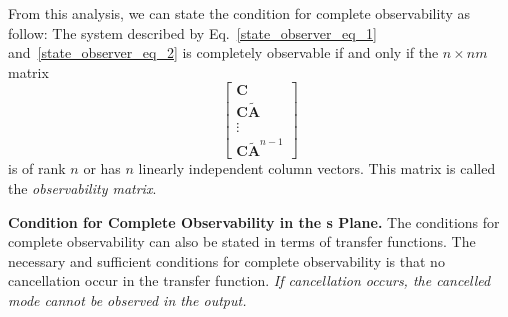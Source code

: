 \documentclass[12pt,a4paper,oneside]{book}
\begin{document}
\begin{onehalfspace}
From this analysis, we can state the condition for complete observability as 
follow: The system described by Eq.~\eqref{state_observer_eq_1} 
and~\eqref{state_observer_eq_2} is completely observable if and only if the $n 
\times nm$ matrix
\begin{equation}
\begin{bmatrix}
	\mathbf{C}  \\
	\mathbf{C}\tilde{\mathbf{A}} \\
	\vdots \\
	\mathbf{C}\tilde{\mathbf{A}}^{n-1}
\end{bmatrix}
\end{equation}
is of rank $n$ or has $n$ linearly independent column vectors. This matrix is 
called the \textit{observability matrix}.

\vspace{5mm}
\textbf{Condition for Complete Observability in the s Plane.} The conditions 
for complete observability can also be stated in terms of transfer functions. 
The necessary and sufficient conditions for complete observability is that no 
cancellation occur in the transfer function. \textit{If cancellation occurs, 
the cancelled mode cannot be observed in the output.}


\end{onehalfspace}
\end{document}
